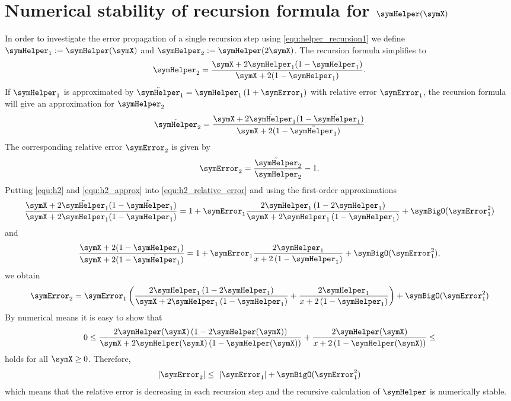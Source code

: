 \documentclass[a4paper]{scrartcl}
\begin{document}
\section{Numerical stability of recursion formula for $\symHelper(\symX)$}
\label{app:helper_stable}
In order to investigate the error propagation of a single recursion step using \eqref{equ:helper_recursion1} we define $\symHelper_1 := \symHelper(\symX)$ and $\symHelper_2 := \symHelper(2\symX)$. The recursion formula simplifies to
\begin{equation}
\label{equ:h2}
\symHelper_2 = \frac{\symX+2\symHelper_1(1-\symHelper_1)}{\symX+2(1-\symHelper_1)}.
\end{equation}
If $\symHelper_1$ is approximated by $\tilde{\symHelper}_1 = \symHelper_1\left(1+\symError_1\right)$ with relative error $\symError_1$, the recursion formula will give an approximation for $\symHelper_2$
\begin{equation}
\label{equ:h2_approx}
\tilde{\symHelper}_2 = 
\frac{\symX+2\tilde{\symHelper}_1(1-\tilde{\symHelper}_1)}{\symX+2(1-\tilde{\symHelper_1})}
\end{equation}
The corresponding relative error $\symError_2$ is given by
\begin{equation}
\label{equ:h2_relative_error}
\symError_2 = \frac{\tilde{\symHelper}_2}{\symHelper_2}-1.
\end{equation}
Putting \eqref{equ:h2} and \eqref{equ:h2_approx} into \eqref{equ:h2_relative_error} and using the first-order approximations 
\begin{equation}
\frac{\symX+2\tilde{\symHelper}_1(1-\tilde{\symHelper}_1)}
{\symX+2\symHelper_1(1-\symHelper_1)}
=
1
+
\symError_1
\frac{2\symHelper_1\left(1-2\symHelper_1\right)}
{\symX + 2\symHelper_1\left(1-\symHelper_1\right)}
+\symBigO(\symError_1^2)
\end{equation}
and
\begin{equation}
\frac{\symX+2(1-\symHelper_1)}
{\symX+2(1-\tilde{\symHelper}_1)}
=
1
+
\symError_1
\frac{2\symHelper_1}{x+2\left(1-\symHelper_1\right)}
+\symBigO(\symError_1^2),
\end{equation}
we obtain
\begin{equation}
\symError_2
=
\symError_1
\left(
\frac{2\symHelper_1\left(1-2\symHelper_1\right)}
{\symX + 2\symHelper_1\left(1-\symHelper_1\right)}
+
\frac{2\symHelper_1}{x+2\left(1-\symHelper_1\right)}
\right)
+\symBigO(\symError_1^2)
\end{equation}
By numerical means it is easy to show that
\begin{equation}
0\leq\frac{2\symHelper(\symX)\left(1-2\symHelper(\symX)\right)}
{\symX + 2\symHelper(\symX)\left(1-\symHelper(\symX)\right)}
+
\frac{2\symHelper(\symX)}{x+2\left(1-\symHelper(\symX)\right)} \leq 
\end{equation}
holds for all $\symX \geq 0$. Therefore,
\begin{equation}
|\symError_2|\leq \  |\symError_1| + \symBigO(\symError_1^2)
\end{equation}
which means that the relative error is decreasing in each recursion step and the recursive calculation of $\symHelper$ is numerically stable.
\end{document}
